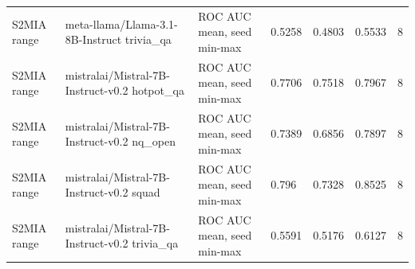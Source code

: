 \begin{tabular}{lllllll}
S2MIA range & meta-llama/Llama-3.1-8B-Instruct trivia\_qa & ROC AUC mean, seed min-max & 0.5258 & 0.4803 & 0.5533 & 8 \\
S2MIA range & mistralai/Mistral-7B-Instruct-v0.2 hotpot\_qa & ROC AUC mean, seed min-max & 0.7706 & 0.7518 & 0.7967 & 8 \\
S2MIA range & mistralai/Mistral-7B-Instruct-v0.2 nq\_open & ROC AUC mean, seed min-max & 0.7389 & 0.6856 & 0.7897 & 8 \\
S2MIA range & mistralai/Mistral-7B-Instruct-v0.2 squad & ROC AUC mean, seed min-max & 0.796 & 0.7328 & 0.8525 & 8 \\
S2MIA range & mistralai/Mistral-7B-Instruct-v0.2 trivia\_qa & ROC AUC mean, seed min-max & 0.5591 & 0.5176 & 0.6127 & 8 \\
\bottomrule
\end{tabular}

